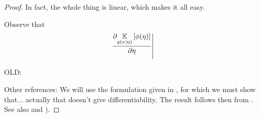 \begin{thm}
\begin{proof}
In fact, the whole thing is linear, which makes it all easy.

Observe that
%
\begin{align*}
%
\fracat{\partial \expect{\q(\nu \vert \eta)}{\phi(\eta)}}{\partial \eta}{}
%
\end{align*}
%



OLD:

Other references: We will use the
formulation given in \citep[Theorem 3.4.10]{krantz:2012:implicit}, for which
we must show that... actually that doesn't give differentiability.
The result follows then from \citet[Proposition 4.8(c)]{zeidler:2013:functional}.
See also \citet[Corollary 1.4]{averbukh:1967:theory} and \citep[Appendix
A]{reeds:1976:thesis}).
%
\end{proof}
%
\end{thm}
%
